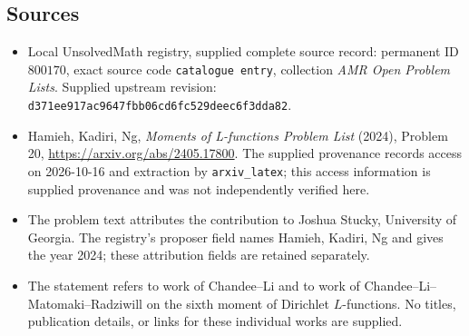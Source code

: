 \documentclass[11pt]{article}
\begin{document}
\subsection{Sources}
\begin{itemize}
\item Local UnsolvedMath registry, supplied complete source record: permanent ID \(800170\), exact source code \texttt{catalogue entry}, collection \emph{AMR Open Problem Lists}. Supplied upstream revision: \texttt{d371ee917ac9647fbb06cd6fc529deec6f3dda82}.
\item Hamieh, Kadiri, Ng, \emph{Moments of L-functions Problem List} (2024), Problem 20, \url{https://arxiv.org/abs/2405.17800}. The supplied provenance records access on 2026-10-16 and extraction by \texttt{arxiv\_latex}; this access information is supplied provenance and was not independently verified here.
\item The problem text attributes the contribution to Joshua Stucky, University of Georgia. The registry's proposer field names Hamieh, Kadiri, Ng and gives the year 2024; these attribution fields are retained separately.
\item The statement refers to work of Chandee--Li and to work of Chandee--Li--Matomaki--Radziwill on the sixth moment of Dirichlet \(L\)-functions. No titles, publication details, or links for these individual works are supplied.
\end{itemize}
\end{document}
